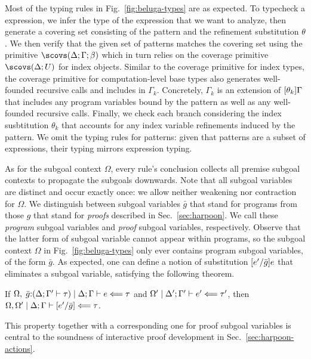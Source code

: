 Most of the typing rules in Fig.~\ref{fig:beluga-types} are as expected.
To typecheck a \tcases expression, we infer the type of the expression that we
want to analyze, then generate a covering set consisting of the pattern and the
refinement substitution $\theta$.
We then verify that the given set of patterns matches the covering set using the
primitive $\scovs(\Delta;\Gamma;\beta)$ which in turn relies on the coverage
primitive $\scovs(\Delta;U)$ for index objects.
Similar to the coverage primitive for index types, the coverage primitive for
computation-level base types also generates well-founded recursive calls and
includes in $\Gamma_k$.
Concretely, $\Gamma_k$ is an extension of $[\theta_k]\Gamma$
that includes any program variables bound by the pattern as well as any
well-founded recursive calls.
Finally, we check each branch considering the index susbtitution $\theta_k$
that accounts for any index variable refinements induced by the pattern.
We omit the typing rules for patterns: given that patterns are a subset of
expressions, their typing mirrors expression typing.

As for the subgoal context $\Omega$, every rule's conclusion collects all
premise subgoal contexts to propagate the subgoals downwards.
Note that all subgoal variables are distinct and occur exactly once: we
allow neither weakening nor contraction for $\Omega$.
We distinguish between subgoal variables $\bar g$ that stand for programs from
those $g$ that stand for \emph{proofs} described in Sec.~\ref{sec:harpoon}.
We call these \emph{program} subgoal variables and \emph{proof} subgoal
variables, respectively.
Observe that the latter form of subgoal variable cannot appear within programs,
so the subgoal context $\Omega$ in Fig.~\ref{fig:beluga-types} only ever
contains program subgoal variables, of the form $\bar g$.
As expected, one can define a notion of substitution $[e^\prime/\bar g]e$
that eliminates a subgoal variable, satisfying the following theorem.

\begin{thm}
  If $\Omega,\; \bar g{:}(\Delta; \Gamma^\prime \vdash \tau)\mid\Delta; \Gamma \vdash e \Longleftarrow \tau$
  and $\Omega^\prime\mid\Delta^\prime; \Gamma^\prime \vdash e^\prime \Longleftarrow \tau^\prime$,
  then $\Omega,\Omega^\prime\mid\Delta; \Gamma \vdash [e^\prime/\bar g]\Longleftarrow \tau$.
\end{thm}

This property together with a corresponding one for proof subgoal variables is
central to the soundness of interactive proof development in
Sec.~\ref{sec:harpoon-actions}.


